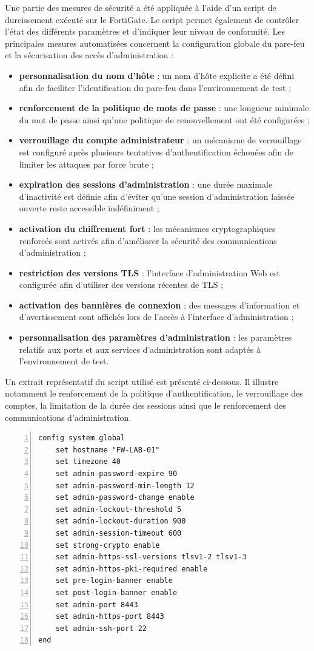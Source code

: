Une partie des mesures de sécurité a été appliquée à l'aide d'un script de durcissement exécuté sur le FortiGate. Le script permet également de contrôler l'état des différents paramètres et d'indiquer leur niveau de conformité. Les principales mesures automatisées concernent la configuration globale du pare-feu et la sécurisation des accès d'administration :
\begin{itemize}
  \item \textbf{personnalisation du nom d'hôte} : un nom d'hôte explicite a été défini afin de faciliter l'identification du pare-feu dans l'environnement de test ;
  \item \textbf{renforcement de la politique de mots de passe} : une longueur minimale du mot de passe ainsi qu'une politique de renouvellement ont été configurées ;
  \item \textbf{verrouillage du compte administrateur} : un mécanisme de verrouillage est configuré après plusieurs tentatives d'authentification échouées afin de limiter les attaques par force brute ;
  \item \textbf{expiration des sessions d'administration} : une durée maximale d'inactivité est définie afin d'éviter qu'une session d'administration laissée ouverte reste accessible indéfiniment ;
  \item \textbf{activation du chiffrement fort} : les mécanismes cryptographiques renforcés sont activés afin d'améliorer la sécurité des communications d'administration ;
  \item \textbf{restriction des versions TLS} : l'interface d'administration Web est configurée afin d'utiliser des versions récentes de TLS ;
  \item \textbf{activation des bannières de connexion} : des messages d'information et d'avertissement sont affichés lors de l'accès à l'interface d'administration ;
  \item \textbf{personnalisation des paramètres d'administration} : les paramètres relatifs aux ports et aux services d'administration sont adaptés à l'environnement de test.
\end{itemize}

Un extrait représentatif du script utilisé est présenté ci-dessous. Il illustre notamment le renforcement de la politique d'authentification, le verrouillage des comptes, la limitation de la durée des sessions ainsi que le renforcement des communications d'administration.

\begin{lstlisting}[numbers=left,numberstyle=\tiny\color{accent2},numbersep=6pt]
config system global
    set hostname "FW-LAB-01"
    set timezone 40
    set admin-password-expire 90
    set admin-password-min-length 12
    set admin-password-change enable
    set admin-lockout-threshold 5
    set admin-lockout-duration 900
    set admin-session-timeout 600
    set strong-crypto enable
    set admin-https-ssl-versions tlsv1-2 tlsv1-3
    set admin-https-pki-required enable
    set pre-login-banner enable
    set post-login-banner enable
    set admin-port 8443
    set admin-https-port 8443
    set admin-ssh-port 22
end
\end{lstlisting}

